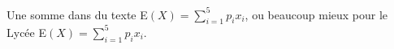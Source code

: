 \documentclass{article}
\begin{document}
	Une somme dans du texte E$(X) = \sum_{i=1}^{5} p_i x_i$, ou beaucoup mieux pour le Lycée E$(X) = \sum\limits_{i=1}^{5} p_i x_i$.
\end{document}
